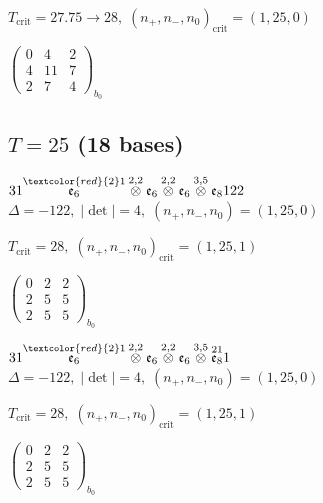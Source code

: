 \documentclass[10pt]{article}
\begin{document}
\hspace{1em}$T_{\text{crit}}=27.75 \to 28,\; (n_+,n_-,n_0)_{\text{crit}}=(1,25,0)$

\hspace{2em}$\left(\begin{smallmatrix}0 & 4 & 2 \\ 4 & 11 & 7 \\ 2 & 7 & 4\end{smallmatrix}\right)_{\!b_0}$


\subsection*{$T = 25$ \quad (18 bases)}
\smallskip

$31\overset{\textcolor{red}{2}1}{\mathfrak{e}_6}\overset{2,2}{\otimes}\mathfrak{e}_6\overset{2,2}{\otimes}\mathfrak{e}_6\overset{3,5}{\otimes}\mathfrak{e}_8122$ \quad $\Delta=-122,\; |\det|=4,\; (n_+,n_-,n_0)=(1,25,0)$

\hspace{1em}$T_{\text{crit}}=28,\; (n_+,n_-,n_0)_{\text{crit}}=(1,25,1)$

\hspace{2em}$\left(\begin{smallmatrix}0 & 2 & 2 \\ 2 & 5 & 5 \\ 2 & 5 & 5\end{smallmatrix}\right)_{\!b_0}$

\smallskip

$31\overset{\textcolor{red}{2}1}{\mathfrak{e}_6}\overset{2,2}{\otimes}\mathfrak{e}_6\overset{2,2}{\otimes}\mathfrak{e}_6\overset{3,5}{\otimes}\overset{21}{\mathfrak{e}_8}1$ \quad $\Delta=-122,\; |\det|=4,\; (n_+,n_-,n_0)=(1,25,0)$

\hspace{1em}$T_{\text{crit}}=28,\; (n_+,n_-,n_0)_{\text{crit}}=(1,25,1)$

\hspace{2em}$\left(\begin{smallmatrix}0 & 2 & 2 \\ 2 & 5 & 5 \\ 2 & 5 & 5\end{smallmatrix}\right)_{\!b_0}$
\end{document}
